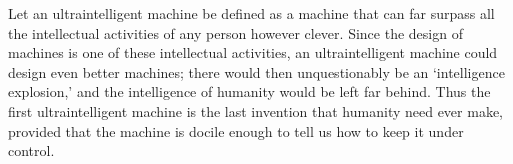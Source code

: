 {

Let an ultraintelligent machine be defined as a machine that can far surpass all the intellectual activities of any person however clever. Since the design of machines is one of these intellectual activities, an ultraintelligent machine could design even better machines; there would then unquestionably be an ‘intelligence explosion,’ and the intelligence of humanity would be left far behind. Thus the first ultraintelligent machine is the last invention that humanity need ever make, provided that the machine is docile enough to tell us how to keep it under control.

\vfill
{}


}


